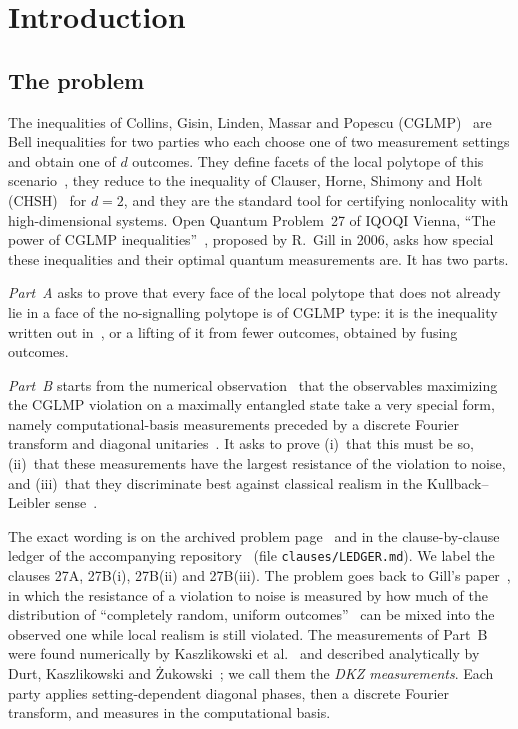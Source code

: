 \documentclass[11pt]{article}
\theoremstyle{remark}
\numberwithin{equation}{section}
\begin{document}
\section{Introduction}\label{sec:intro}

\subsection{The problem}
The inequalities of Collins, Gisin, Linden, Massar and Popescu (CGLMP)~\cite{CGLMP} are Bell inequalities for two
parties who each choose one of two measurement settings and obtain one of $d$ outcomes. They define facets of the local
polytope of this scenario~\cite{Masanes}, they reduce to the inequality of Clauser, Horne, Shimony and Holt
(CHSH)~\cite{CHSH} for $d=2$, and they are the standard tool for certifying nonlocality with high-dimensional systems.
Open Quantum Problem~27 of IQOQI Vienna, ``The power of CGLMP inequalities''~\cite{OQP}, proposed by R.~Gill in 2006,
asks how special these inequalities and their optimal quantum measurements are. It has two parts.

\emph{Part~A} asks to prove that every face of the local polytope that does not already lie in a face of the
no-signalling polytope is of CGLMP type: it is the inequality written out in~\cite{CGLMP}, or a lifting of it from
fewer outcomes, obtained by fusing outcomes.

\emph{Part~B} starts from the numerical observation~\cite{DKZ} that the observables maximizing the CGLMP violation on
a maximally entangled state take a very special form, namely computational-basis measurements preceded by a discrete
Fourier transform and diagonal unitaries~\cite{CGLMP}. It asks to prove (i)~that this must be so, (ii)~that these
measurements have the largest resistance of the violation to noise, and (iii)~that they discriminate best against
classical realism in the Kullback--Leibler sense~\cite{vDGG}.

The exact wording is on the archived problem page~\cite{OQP} and in the clause-by-clause ledger of the accompanying
repository~\cite{repo} (file \texttt{clauses/LEDGER.md}). We label the clauses 27A, 27B(i), 27B(ii) and
27B(iii). The problem goes back to Gill's paper~\cite{Gill}, in which the resistance of a violation to noise is measured
by how much of the distribution of ``completely random, uniform outcomes''~\cite[p.~140]{Gill} can be mixed into the
observed one while local realism is still violated. The measurements of Part~B were found numerically by Kaszlikowski
et al.~\cite{KGZMZ} and described analytically by Durt, Kaszlikowski and \.Zukowski~\cite{DKZ}; we call them the
\emph{DKZ measurements}. Each party applies setting-dependent diagonal phases, then a discrete Fourier transform, and
measures in the computational basis.
\end{document}
